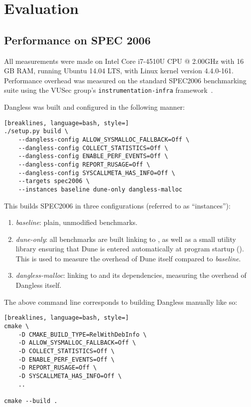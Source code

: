 \chapter{Evaluation}

\section{Performance on SPEC 2006}

All measurements were made on Intel Core i7-4510U CPU @ 2.00GHz with 16 GB RAM, running Ubuntu 14.04 LTS, with Linux kernel version 4.4.0-161. Performance overhead was measured on the standard SPEC2006 benchmarking suite using the VUSec group's \texttt{instrumentation-infra} framework~\cite{vusec-infra}.

Dangless was built and configured in the following manner:

\begin{lstlisting}[breaklines, language=bash, style=]
./setup.py build \
	--dangless-config ALLOW_SYSMALLOC_FALLBACK=Off \
	--dangless-config COLLECT_STATISTICS=Off \
	--dangless-config ENABLE_PERF_EVENTS=Off \
	--dangless-config REPORT_RUSAGE=Off \
	--dangless-config SYSCALLMETA_HAS_INFO=Off \
	--targets spec2006 \
	--instances baseline dune-only dangless-malloc
\end{lstlisting}

This builds SPEC2006 in three configurations (referred to as ``instances''):
\begin{enumerate}
	\item \emph{baseline}: plain, unmodified benchmarks.
	\item \emph{dune-only}: all benchmarks are built linking to , as well as a small utility library ensuring that Dune is entered automatically at program startup (). This is used to measure the overhead of Dune itself compared to \emph{baseline}.
	\item \emph{dangless-malloc}: linking to  and its dependencies, measuring the overhead of Dangless itself.
\end{enumerate}

The above command line corresponds to building Dangless manually like so:

\begin{lstlisting}[breaklines, language=bash, style=]
cmake \
	-D CMAKE_BUILD_TYPE=RelWithDebInfo \
	-D ALLOW_SYSMALLOC_FALLBACK=Off \
	-D COLLECT_STATISTICS=Off \
	-D ENABLE_PERF_EVENTS=Off \
	-D REPORT_RUSAGE=Off \
	-D SYSCALLMETA_HAS_INFO=Off \
	..

cmake --build .
\end{lstlisting}

